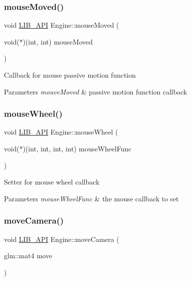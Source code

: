 \subsubsection{\texorpdfstring{mouse\+Moved()}{mouseMoved()}}
{\footnotesize\ttfamily void \hyperlink{Engine_8h_a77278c8cc96e39fb27b5d0a347c8fb3d}{L\+I\+B\+\_\+\+A\+PI} Engine\+::mouse\+Moved (\begin{DoxyParamCaption}\item[{void($\ast$)(int, int)}]{mouse\+Moved }\end{DoxyParamCaption})}

Callback for mouse passive motion function 
\begin{DoxyParams}{Parameters}
{\em mouve\+Moved} & passive motion function callback \\
\hline
\end{DoxyParams}
\mbox{\label{classEngine_a57d57550b28d0c5c3ae92fcbaf5dd82b}} 
\subsubsection{\texorpdfstring{mouse\+Wheel()}{mouseWheel()}}
{\footnotesize\ttfamily void \hyperlink{Engine_8h_a77278c8cc96e39fb27b5d0a347c8fb3d}{L\+I\+B\+\_\+\+A\+PI} Engine\+::mouse\+Wheel (\begin{DoxyParamCaption}\item[{void($\ast$)(int, int, int, int)}]{mouse\+Wheel\+Func }\end{DoxyParamCaption})}

Setter for mouse wheel callback 
\begin{DoxyParams}{Parameters}
{\em mouse\+Wheel\+Func} & the mouse callback to set \\
\hline
\end{DoxyParams}
\mbox{\label{classEngine_af6210e638d3512ddf222ec53b1c29a57}} 
\subsubsection{\texorpdfstring{move\+Camera()}{moveCamera()}}
{\footnotesize\ttfamily void \hyperlink{Engine_8h_a77278c8cc96e39fb27b5d0a347c8fb3d}{L\+I\+B\+\_\+\+A\+PI} Engine\+::move\+Camera (\begin{DoxyParamCaption}\item[{glm\+::mat4}]{move }\end{DoxyParamCaption})}

